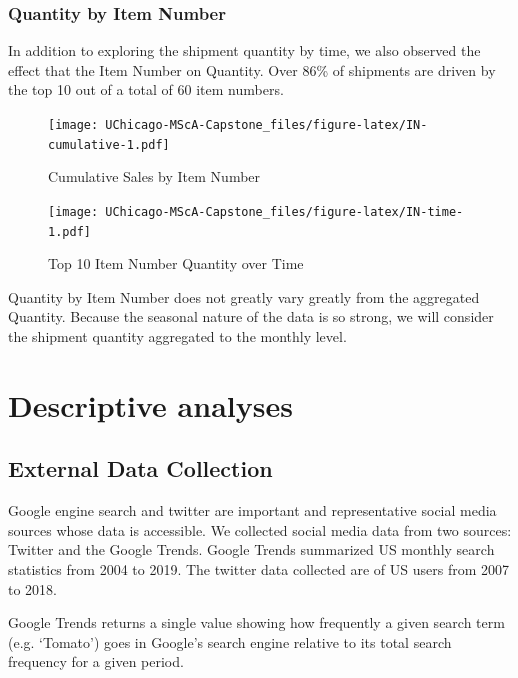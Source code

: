 \documentclass[12pt,oneside]{chicagocapstone}
\begin{document}
\subsubsection*{Quantity by Item Number}\label{methodology-IN}

In addition to exploring the shipment quantity by time, we also observed
the effect that the Item Number on Quantity. Over 86\% of shipments are
driven by the top 10 out of a total of 60 item numbers.
\begin{figure}
\centering
\texttt{[image: UChicago-MScA-Capstone\_files/figure-latex/IN-cumulative-1.pdf]}
\caption{\label{fig:IN-cumulative}Cumulative Sales by Item Number}
\end{figure}
\begin{figure}
\centering
\texttt{[image: UChicago-MScA-Capstone\_files/figure-latex/IN-time-1.pdf]}
\caption{\label{fig:IN-time}Top 10 Item Number Quantity over Time}
\end{figure}
Quantity by Item Number does not greatly vary greatly from the
aggregated Quantity. Because the seasonal nature of the data is so
strong, we will consider the shipment quantity aggregated to the monthly
level.

\section*{Descriptive analyses}\label{methodology-descriptive}

\subsection*{External Data Collection}\label{methodology-external-data}

Google engine search and twitter are important and representative social
media sources whose data is accessible. We collected social media data
from two sources: Twitter and the Google Trends. Google Trends
summarized US monthly search statistics from 2004 to 2019. The twitter
data collected are of US users from 2007 to 2018.

Google Trends returns a single value showing how frequently a given
search term (e.g. `Tomato') goes in Google's search engine relative to
its total search frequency for a given period.
\end{document}
